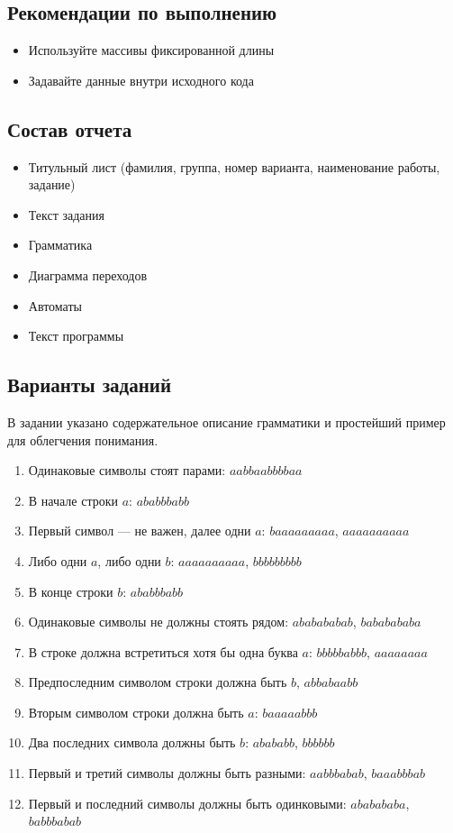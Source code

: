 \documentclass[a4paper,12pt]{article}
\begin{document}
\subsection{Рекомендации по выполнению}
\begin{itemize}
	\item Используйте массивы фиксированной длины
	\item Задавайте данные внутри исходного кода
\end{itemize}

\subsection{Состав отчета}
\begin{itemize}
	\item Титульный лист (фамилия, группа, номер варианта, наименование работы, задание)
	\item Текст задания
	\item Грамматика
	\item Диаграмма переходов
	\item Автоматы
	\item Текст программы
\end{itemize}

\subsection{Варианты заданий}
В задании указано содержательное описание грамматики и простейший пример для облегчения понимания.
\begin{enumerate}
	\item Одинаковые символы стоят парами: $aabbaabbbbaa$
	\item В начале строки $a$: $ababbbabb$
	\item Первый символ — не важен, далее одни $a$: $baaaaaaaaa$, $aaaaaaaaaa$
	\item Либо одни $a$, либо одни $b$: $aaaaaaaaaa$, $bbbbbbbbb$
	\item В конце строки $b$: $ababbbabb$
	\item Одинаковые символы не должны стоять рядом: $ababababab$, $bababababa$
	\item В строке должна встретиться хотя бы одна буква $a$: $bbbbbabbb$, $aaaaaaaa$
	\item Предпоследним символом строки должна быть $b$, $abbabaabb$
	\item Вторым символом строки должна быть $a$: $baaaaabbb$
	\item Два последних символа должны быть $b$: $abababb$, $bbbbbb$
	\item Первый и третий символы должны быть разными: $aabbbabab$, $baaabbbab$
	\item Первый и последний символы должны быть одинковыми: $ababababa$, $babbbabab$
\end{enumerate}
\end{document}
